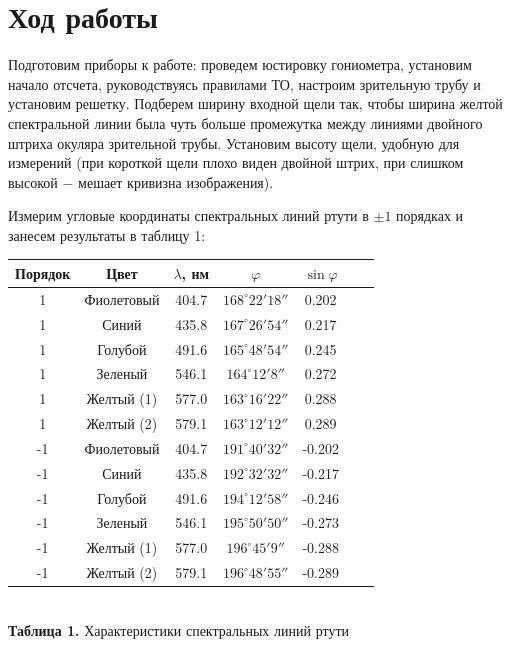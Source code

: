 \documentclass[a4paper,12pt]{article} %
\begin{document}
\section{Ход работы}
\hfill \break Подготовим приборы к работе: проведем юстировку гониометра, установим начало отсчета, руководствуясь правилами ТО, настроим зрительную трубу и установим решетку. Подберем ширину входной щели так, чтобы ширина желтой спектральной линии была чуть больше промежутка между линиями двойного штриха окуляра зрительной трубы. Установим высоту щели, удобную для измерений (при короткой щели плохо виден двойной штрих, при слишком высокой $-$ мешает кривизна изображения). 

\hfill \break Измерим угловые координаты спектральных линий ртути в $\pm 1$ порядках и занесем результаты в таблицу 1:

\begin{center}
\begin{tabular}{|c|c|c|c|c|c|c|}\hline
Порядок & Цвет & $ \lambda $, нм & $ \varphi $ & $ \sin{\varphi} $ \\\hline
1 & Фиолетовый & 404.7 & $168^\circ22'18''$ & 0.202 \\\hline
1 & Синий & 435.8 & $167^\circ26'54''$ & 0.217 \\\hline
1 & Голубой & 491.6 & $165^\circ48'54''$ & 0.245 \\\hline
1 & Зеленый & 546.1 & $164^\circ12'8''$ & 0.272 \\\hline
1 & Желтый (1) & 577.0 & $163^\circ16'22''$ & 0.288 \\\hline
1 & Желтый (2) & 579.1 & $163^\circ12'12''$ & 0.289 \\\hline
-1 & Фиолетовый & 404.7 & $191^\circ40'32''$ & -0.202 \\\hline
-1 & Синий & 435.8 & $192^\circ32'32''$ & -0.217 \\\hline
-1 & Голубой & 491.6 & $194^\circ12'58''$ & -0.246 \\\hline
-1 & Зеленый & 546.1 & $195^\circ50'50''$ & -0.273 \\\hline
-1 & Желтый (1) & 577.0 & $196^\circ45'9''$ & -0.288 \\\hline
-1 & Желтый (2) & 579.1 & $196^\circ48'55''$ & -0.289 \\\hline
\end{tabular} \\
\hfill \break \textbf {Таблица 1.} Характеристики спектральных линий ртути\\
\end{center}
\end{document}
